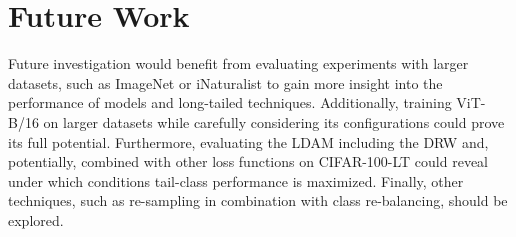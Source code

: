 \section{Future Work}
Future investigation would benefit from evaluating experiments with larger datasets, such as ImageNet or iNaturalist to gain more insight into the performance of models and long-tailed techniques. Additionally, training ViT-B/16 on larger datasets while carefully considering its configurations could prove its full potential. Furthermore, evaluating the LDAM including the DRW and, potentially, combined with other loss functions on CIFAR-100-LT could reveal under which conditions tail-class performance is maximized. Finally, other techniques, such as re-sampling in combination with class re-balancing, should be explored.